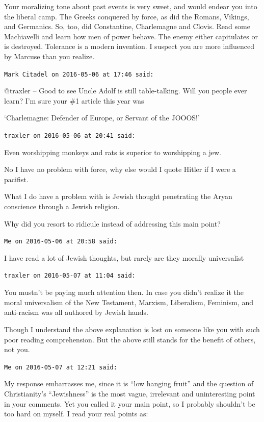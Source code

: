 \begin{footnotesize}
\begin{sffamily}
Your moralizing tone about past events is very sweet, and would endear you into the liberal camp. The Greeks conquered by force, as did the Romans, Vikings, and Germanics. So, too, did Constantine, Charlemagne and Clovis. Read some Machiavelli and learn how men of power behave. The enemy either capitulates or is destroyed. Tolerance is a modern invention. I suspect you are more influenced by Marcuse than you realize.

\hfill

\texttt{Mark Citadel on 2016-05-06 at 17:46 said:}

@traxler -- Good to see Uncle Adolf is still table-talking. Will you people ever learn? I'm sure your \#1 article this year was

`Charlemagne: Defender of Europe, or Servant of the JOOOS!'

\hfill

\texttt{traxler on 2016-05-06 at 20:41 said:}

Even worshipping monkeys and rats is superior to worshipping a jew.

No I have no problem with force, why else would I quote Hitler if I were a pacifist.

What I do have a problem with is Jewish thought penetrating the Aryan conscience through a Jewish religion.

Why did you resort to ridicule instead of addressing this main point?

\hfill

\texttt{Me on 2016-05-06 at 20:58 said:}

I have read a lot of Jewish thoughts, but rarely are they morally universalist

\hfill

\texttt{traxler on 2016-05-07 at 11:04 said:}

You mustn't be paying much attention then. In case you didn't realize it the moral universalism of the New Testament, Marxism, Liberalism, Feminism, and anti-racism was all authored by Jewish hands.

Though I understand the above explanation is lost on someone like you with such poor reading comprehension. But the above still stands for the benefit of others, not you.

\hfill

\texttt{Me on 2016-05-07 at 12:21 said:}

My response embarrasses me, since it is ``low hanging fruit'' and the question of Christianity's ``Jewishness'' is the most vague, irrelevant and uninteresting point in your comments. Yet you called it your main point, so I probably shouldn't be too hard on myself. I read your real points as:


\end{sffamily}
\end{footnotesize}
